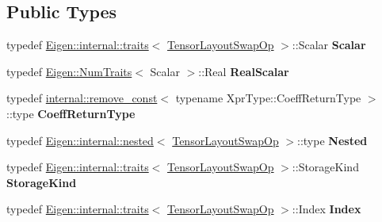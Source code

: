 \subsection*{Public Types}
\begin{DoxyCompactItemize}
\item 
\mbox{\label{class_eigen_1_1_tensor_layout_swap_op_a20ae6494c8a28efbe09d73aaa66255dc}} 
typedef \hyperlink{struct_eigen_1_1internal_1_1traits}{Eigen\+::internal\+::traits}$<$ \hyperlink{class_eigen_1_1_tensor_layout_swap_op}{Tensor\+Layout\+Swap\+Op} $>$\+::Scalar {\bfseries Scalar}
\item 
\mbox{\label{class_eigen_1_1_tensor_layout_swap_op_a87c5bb0704b7114dc1b4019891f8402f}} 
typedef \hyperlink{group___core___module_struct_eigen_1_1_num_traits}{Eigen\+::\+Num\+Traits}$<$ Scalar $>$\+::Real {\bfseries Real\+Scalar}
\item 
\mbox{\label{class_eigen_1_1_tensor_layout_swap_op_a6892c6df61670ebee33d496a221a9cf3}} 
typedef \hyperlink{struct_eigen_1_1internal_1_1remove__const}{internal\+::remove\+\_\+const}$<$ typename Xpr\+Type\+::\+Coeff\+Return\+Type $>$\+::type {\bfseries Coeff\+Return\+Type}
\item 
\mbox{\label{class_eigen_1_1_tensor_layout_swap_op_a72f43eaff0e169d4aa36ec685410ee21}} 
typedef \hyperlink{struct_eigen_1_1internal_1_1nested}{Eigen\+::internal\+::nested}$<$ \hyperlink{class_eigen_1_1_tensor_layout_swap_op}{Tensor\+Layout\+Swap\+Op} $>$\+::type {\bfseries Nested}
\item 
\mbox{\label{class_eigen_1_1_tensor_layout_swap_op_a3c68c85d4afc4847f13329183bc13510}} 
typedef \hyperlink{struct_eigen_1_1internal_1_1traits}{Eigen\+::internal\+::traits}$<$ \hyperlink{class_eigen_1_1_tensor_layout_swap_op}{Tensor\+Layout\+Swap\+Op} $>$\+::Storage\+Kind {\bfseries Storage\+Kind}
\item 
\mbox{\label{class_eigen_1_1_tensor_layout_swap_op_adf614acb71ffa78c84c9ba05d44116bb}} 
typedef \hyperlink{struct_eigen_1_1internal_1_1traits}{Eigen\+::internal\+::traits}$<$ \hyperlink{class_eigen_1_1_tensor_layout_swap_op}{Tensor\+Layout\+Swap\+Op} $>$\+::Index {\bfseries Index}

\end{DoxyCompactItemize}
